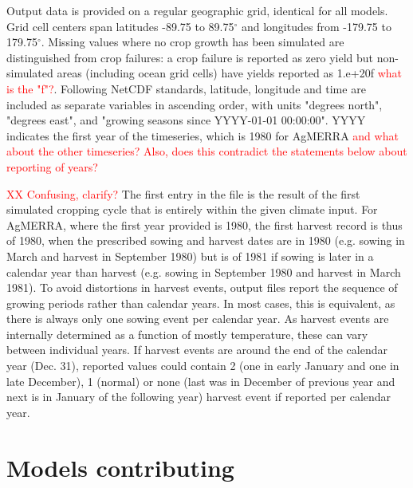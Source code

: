 \documentclass[gmd, manuscript]{copernicus} %
\begin{document}
Output data is provided on a regular geographic grid, identical for all models. 
Grid cell centers span latitudes -89.75 to 89.75$^{\circ}$ and longitudes from -179.75 to 179.75$^{\circ}$. 
Missing values  where no crop growth has been simulated are distinguished from crop failures: a crop failure is reported as zero yield but non-simulated areas (including ocean grid cells) have yields reported as 1.e+20f \textcolor{red}{what is the "f"?}. 
Following NetCDF standards, latitude, longitude and time are included as separate variables in ascending order, with
units "degrees north", "degrees east", and "growing seasons since YYYY-01-01 00:00:00". YYYY indicates the first year of the timeseries, which is 1980 for AgMERRA \textcolor{red}{and what about the other timeseries? Also, does this contradict the statements below about reporting of years?} 

\textcolor{red}{XX Confusing, clarify?} The first entry in the file is the result of the first simulated cropping cycle that is entirely within the given climate input. 
For AgMERRA, where the first year provided is 1980, the first harvest record is thus of 1980, when the prescribed sowing and harvest dates are in 1980 (e.g. sowing in March and harvest in September 1980) but is of 1981 if sowing is later in a calendar year than harvest (e.g. sowing in September 1980 and harvest in March 1981). 
To avoid distortions in harvest events, output files report the sequence of growing periods rather than calendar years. 
In most cases, this is equivalent, as there is always only one sowing event per calendar year.
As harvest events are internally determined as a function of mostly temperature, these can vary between individual years. 
If harvest events are around the end of the calendar year (Dec. 31), reported values could contain 2 (one in early January and one in late December), 1 (normal) or none (last was in December of previous year and next is in January of the following year) harvest event if reported per calendar year.

\section{Models contributing}
\end{document}
